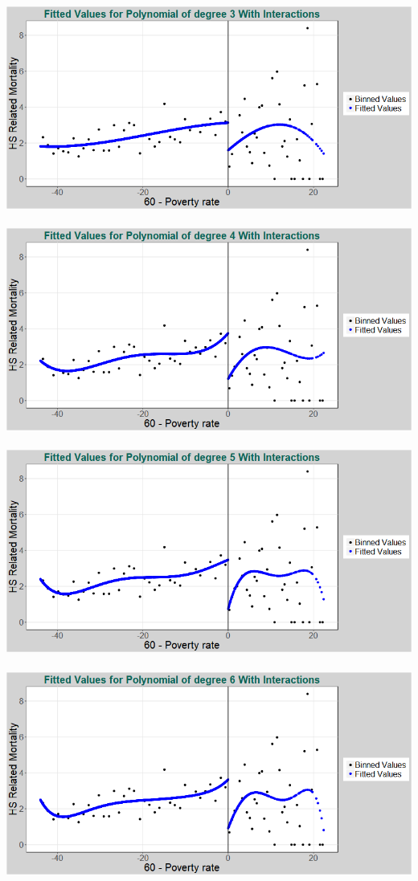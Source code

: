 \documentclass[11pt]{article}
\begin{document}
\includegraphics[width=.8\linewidth]{plot_222_poly_3.png}
\\ \\
\includegraphics[width=.8\linewidth]{plot_222_poly_4.png}
\\ \\
\includegraphics[width=.8\linewidth]{plot_222_poly_5.png}
\\ \\
\includegraphics[width=.8\linewidth]{plot_222_poly_6.png}
\end{document}
